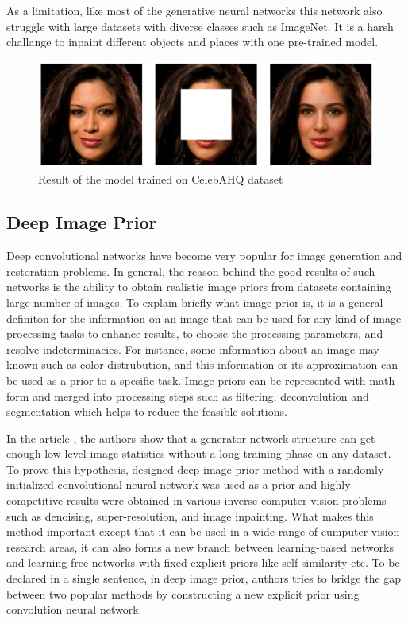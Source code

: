 As a limitation, like most of the generative neural networks this network also struggle with large datasets with diverse classes such as ImageNet. It is a harsh challange to inpaint different objects and places with one pre-trained model.

\begin{figure}[h!]
    \centering
    \includegraphics[width=14cm]{figures/chapter4/gmcnnout1.png}
    \vspace*{3mm}
    \caption{Result of the model trained on CelebAHQ dataset}
    \label{fig:gmcnn_celebA}
\end{figure}

\subsection{Deep Image Prior}

Deep convolutional networks have become very popular for image generation and restoration problems. In general, the reason behind the good results of such networks is the ability to obtain realistic image priors from datasets containing large number of images. To explain briefly what image prior is, it is a general definiton for the information on an image that can be used for any kind of image processing tasks to enhance results, to choose the processing parameters, and resolve indeterminacies. For instance, some information about an image may known such as color distrubution, and this information or its approximation can be used as a prior to a spesific task. Image priors can be represented with math form and merged into processing steps such as filtering, deconvolution and segmentation which helps to reduce the feasible solutions.

In the article \cite{deep_image_prior}, the authors show that a generator network structure can get enough low-level image statistics without a long training phase on any dataset. To prove this hypothesis, designed deep image prior method with a randomly-initialized convolutional neural network was used as a prior and highly competitive results were obtained in various inverse computer vision problems such as denoising, super-resolution, and image inpainting. What makes this method important except that it can be used in a wide range of cumputer vision research areas, it can also forms a new branch between learning-based networks and learning-free networks with fixed explicit priors like self-similarity etc. To be declared in a single sentence, in deep image prior, authors tries to bridge the gap between two popular methods by constructing a new explicit prior using convolution neural network.

